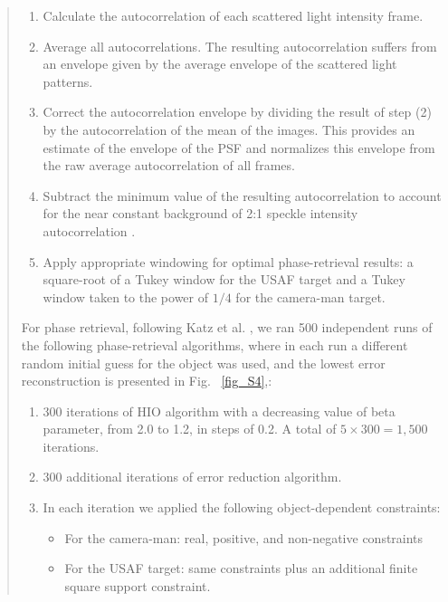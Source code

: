 \documentclass[12pt]{article}
\newenvironment{finished_ourresponse}
    {\begin{tcolorbox}[width=\linewidth,breakable,enhanced,colback=gray!5,colframe=finished_responsecolor!50,title=Response,left=5pt,right=5pt]}
    {\end{tcolorbox}}
\begin{document}
\begin{finished_ourresponse}
\begin{quote}
        \begin{enumerate}
            \item Calculate the autocorrelation of each scattered light intensity frame.
            \item Average all autocorrelations. The resulting autocorrelation suffers from an envelope given by the average envelope of the scattered light patterns.
            \item Correct the autocorrelation envelope by dividing the result of step (2) by the autocorrelation of the mean of the images. This provides an estimate of the envelope of the PSF and normalizes this envelope from the raw average autocorrelation of all frames.
            \item Subtract the minimum value of the resulting autocorrelation to account for the near constant background of 2:1 speckle intensity autocorrelation \cite{katz14}.
            \item Apply appropriate windowing for optimal phase-retrieval results: a square-root of a Tukey window for the USAF target and a Tukey window taken to the power of $1/4$  for the camera-man target.
        \end{enumerate}
        
        For phase retrieval, following Katz et al. \cite{katz14}, we ran 500 independent runs of the following phase-retrieval algorithms, where in each run a different random initial guess for the object was used, and the lowest error reconstruction is presented in Fig. ~\ref{fig_S4},:
        \begin{enumerate}
            \item 300 iterations of HIO algorithm with a decreasing value of beta parameter, from 2.0 to 1.2, in steps of 0.2. A total of $5\times300=1,500$ iterations.
            \item 300 additional iterations of error reduction algorithm.
            \item In each iteration we applied the following object-dependent constraints:
            \begin{itemize}
                \item For the camera-man: real, positive, and non-negative constraints
                \item For the USAF target: same constraints plus an additional finite square support constraint.
            \end{itemize}

        \end{enumerate}
        


\end{quote}
\end{finished_ourresponse}
\end{document}
